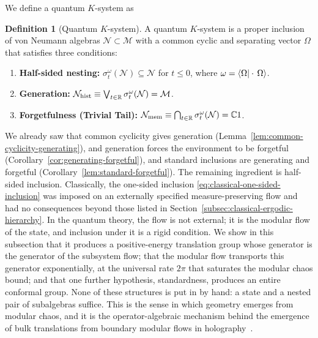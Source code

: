 \documentclass[a4paper,11pt]{article}
\theoremstyle{definition}
\newtheorem{definition}{Definition}[section]
\begin{document}
We define a quantum $K$-system as
\begin{definition}[Quantum $K$-system]
\label{def:quantum-K-system}
A quantum $K$-system is a proper inclusion of von Neumann algebras $\mathcal N \subset \mathcal M$ with a common cyclic and separating vector $\Omega$ that satisfies three conditions:
\begin{enumerate}
    \item \textbf{Half-sided nesting:} $\sigma^\omega_t(\mathcal N) \subseteq \mathcal N$ for $t \le 0$, where $\omega = \braket{\Omega | \cdot \, \Omega}$.
    \item \textbf{Generation:} $\mathcal N_{\rm hist} \equiv \bigvee_{t \in \mathbb R} \sigma^\omega_t(\mathcal N) = \mathcal M$.
    \item \textbf{Forgetfulness (Trivial Tail):} $\mathcal N_{\rm mem} \equiv \bigcap_{t \in \mathbb R} \sigma^\omega_t(\mathcal N) = \mathbb C1$.
\end{enumerate}
\end{definition}



We already saw that common cyclicity gives generation (Lemma~\ref{lem:common-cyclicity-generating}), and generation forces the environment to be forgetful (Corollary~\ref{cor:generating-forgetful}), and standard inclusions are generating and forgetful (Corollary~\ref{lem:standard-forgetful}). The remaining ingredient is half-sided inclusion. Classically, the one-sided inclusion \eqref{eq:classical-one-sided-inclusion} was imposed on an externally specified measure-preserving flow and had no consequences beyond those listed in Section~\ref{subsec:classical-ergodic-hierarchy}. In the quantum theory, the flow is not external; it is the modular flow of the state, and inclusion under it is a rigid condition. We show in this subsection that it produces a positive-energy translation group whose generator is the generator of the subsystem flow; that the modular flow transports this generator exponentially, at the universal rate $2\pi$ that saturates the modular chaos bound; and that one further hypothesis, standardness, produces an entire conformal group. None of these structures is put in by hand: a state and a nested pair of subalgebras suffice. This is the sense in which geometry emerges from modular chaos, and it is the operator-algebraic mechanism behind the emergence of bulk translations from boundary modular flows in holography~\cite{deBoerLamprou2020,LeutheusserLiu2023}.
\end{document}
